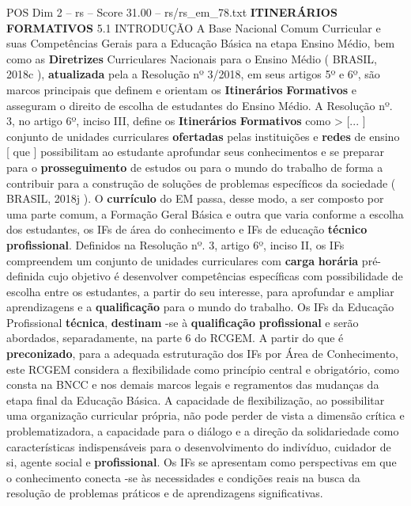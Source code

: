 \begin{textsample}{POS Dim 2 – rs – Score 31.00 – rs/rs\_em\_78.txt}  \label{ex:f2_pos_073}
\textbf{ITINERÁRIOS} \textbf{FORMATIVOS} 5.1 INTRODUÇÃO A Base Nacional Comum Curricular e suas Competências Gerais para a Educação Básica na etapa Ensino Médio, bem como as \textbf{Diretrizes} Curriculares Nacionais para o Ensino Médio ( BRASIL, 2018c ), \textbf{atualizada} pela a Resolução nº 3/2018, em seus artigos 5º e 6º, são marcos principais que definem e orientam os \textbf{Itinerários} \textbf{Formativos} e asseguram o direito de escolha de estudantes do Ensino Médio.
A Resolução nº. 3, no artigo 6º, inciso III, define os \textbf{Itinerários} \textbf{Formativos} como > [... ] conjunto de unidades curriculares \textbf{ofertadas} pelas instituições e \textbf{redes} de ensino [ que ] possibilitam ao estudante aprofundar seus conhecimentos e se preparar para o \textbf{prosseguimento} de estudos ou para o mundo do trabalho de forma a contribuir para a construção de soluções de problemas específicos da sociedade ( BRASIL, 2018j ).
O \textbf{currículo} do EM passa, desse modo, a ser composto por uma parte comum, a Formação Geral Básica e outra que varia conforme a escolha dos estudantes, os IFs de área do conhecimento e IFs de educação \textbf{técnico} \textbf{profissional}.
Definidos na Resolução nº. 3, artigo 6º, inciso II, os IFs compreendem um conjunto de unidades curriculares com \textbf{carga} \textbf{horária} pré-definida cujo objetivo é desenvolver competências específicas com possibilidade de escolha entre os estudantes, a partir do seu interesse, para aprofundar e ampliar aprendizagens e a \textbf{qualificação} para o mundo do trabalho.
Os IFs da Educação Profissional \textbf{técnica}, \textbf{destinam} -se à \textbf{qualificação} \textbf{profissional} e serão abordados, separadamente, na parte 6 do RCGEM.
A partir do que é \textbf{preconizado}, para a adequada estruturação dos IFs por Área de Conhecimento, este RCGEM considera a flexibilidade como princípio central e obrigatório, como consta na BNCC e nos demais marcos legais e regramentos das mudanças da etapa final da Educação Básica.
A capacidade de flexibilização, ao possibilitar uma organização curricular própria, não pode perder de vista a dimensão crítica e problematizadora, a capacidade para o diálogo e a direção da solidariedade como características indispensáveis para o desenvolvimento do indivíduo, cuidador de si, agente social e \textbf{profissional}.
Os IFs se apresentam como perspectivas em que o conhecimento conecta -se às necessidades e condições reais na busca da resolução de problemas práticos e de aprendizagens significativas.

\end{textsample}
